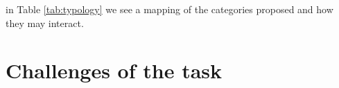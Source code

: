 %
in Table \ref{tab:typology} we see a mapping of the categories proposed and how they may interact.

\section{Challenges of the task}

